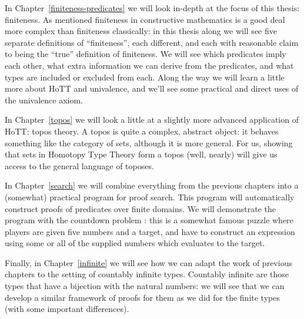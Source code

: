 In Chapter~\ref{finiteness-predicates} we will look in-depth at the focus of
this thesis: finiteness.
As mentioned finiteness in constructive mathematics is a good deal more complex
than finiteness classically:
in this thesis along we will see five separate definitions of ``finiteness'',
each different, and each with reasonable claim to being the ``true'' definition
of finiteness.
We will see which predicates imply each other, what extra information we can
derive from the predicates, and what types are included or excluded from each.
Along the way we will learn a little more about HoTT and univalence, and we'll
see some practical and direct uses of the univalence axiom.

In Chapter~\ref{topos} we will look a little at a slightly more advanced
application of HoTT: topos theory.
A topos is quite a complex, abstract object: it behaves something like the
category of sets, although it is more general.
For us, showing that sets in Homotopy Type Theory form a topos (well, nearly)
will give us access to the general language of toposes.

In Chapter~\ref{search} we will combine everything from the previous chapters
into a (somewhat) practical program for proof search.
This program will automatically construct proofs of predicates over finite
domains.
We will demonstrate the program with the countdown problem
\citep{huttonCountdownProblem2002}: this is a somewhat famous puzzle where
players are given five numbers and a target, and have to construct an expression
using some or all of the supplied numbers which evaluates to the target.

Finally, in Chapter~\ref{infinite} we will see how we can adapt the work of
previous chapters to the setting of countably infinite types.
Countably infinite are those types that have a bijection with the natural
numbers: we will see that we can develop a similar framework of proofs for them
as we did for the finite types (with some important differences).
